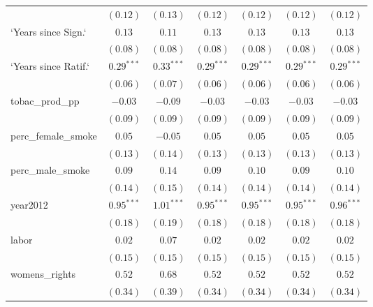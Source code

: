 \begin{table}[!h]
\begin{center}
\begin{tabular}{l c c c c c c }
                        & $(0.12)$     & $(0.13)$     & $(0.12)$     & $(0.12)$     & $(0.12)$     & $(0.12)$     \\
`Years since Sign.`     & $0.13$       & $0.11$       & $0.13$       & $0.13$       & $0.13$       & $0.13$       \\
                        & $(0.08)$     & $(0.08)$     & $(0.08)$     & $(0.08)$     & $(0.08)$     & $(0.08)$     \\
`Years since Ratif.`    & $0.29^{***}$ & $0.33^{***}$ & $0.29^{***}$ & $0.29^{***}$ & $0.29^{***}$ & $0.29^{***}$ \\
                        & $(0.06)$     & $(0.07)$     & $(0.06)$     & $(0.06)$     & $(0.06)$     & $(0.06)$     \\
tobac\_prod\_pp         & $-0.03$      & $-0.09$      & $-0.03$      & $-0.03$      & $-0.03$      & $-0.03$      \\
                        & $(0.09)$     & $(0.09)$     & $(0.09)$     & $(0.09)$     & $(0.09)$     & $(0.09)$     \\
perc\_female\_smoke     & $0.05$       & $-0.05$      & $0.05$       & $0.05$       & $0.05$       & $0.05$       \\
                        & $(0.13)$     & $(0.14)$     & $(0.13)$     & $(0.13)$     & $(0.13)$     & $(0.13)$     \\
perc\_male\_smoke       & $0.09$       & $0.14$       & $0.09$       & $0.10$       & $0.09$       & $0.10$       \\
                        & $(0.14)$     & $(0.15)$     & $(0.14)$     & $(0.14)$     & $(0.14)$     & $(0.14)$     \\
year2012                & $0.95^{***}$ & $1.01^{***}$ & $0.95^{***}$ & $0.95^{***}$ & $0.95^{***}$ & $0.96^{***}$ \\
                        & $(0.18)$     & $(0.19)$     & $(0.18)$     & $(0.18)$     & $(0.18)$     & $(0.18)$     \\
labor                   & $0.02$       & $0.07$       & $0.02$       & $0.02$       & $0.02$       & $0.02$       \\
                        & $(0.15)$     & $(0.15)$     & $(0.15)$     & $(0.15)$     & $(0.15)$     & $(0.15)$     \\
womens\_rights          & $0.52$       & $0.68$       & $0.52$       & $0.52$       & $0.52$       & $0.52$       \\
                        & $(0.34)$     & $(0.39)$     & $(0.34)$     & $(0.34)$     & $(0.34)$     & $(0.34)$     \\

\end{tabular}
\end{center}
\end{table}
